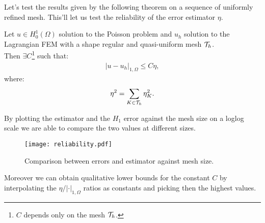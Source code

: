 Let's test the results given by the following theorem on a sequence of uniformly refined mesh. This'll let us test the reliability of the error estimator $\eta$.

\begin{theorem*}[Reliability]
	Let $u \in H_0^1(\Omega)$ solution to the Poisson problem and $u_h$ solution to the Lagrangian FEM with a shape regular and quasi-uniform mesh $\mathcal{T}_h$. \\
	Then $\exists C$\footnote{$C$ depends only on the mesh $\mathcal{T}_h$.} such that:
	\begin{gather}
		\lvert u - u_h \rvert_{1, \Omega} \leq C \eta,
	\end{gather}
	where:
	\begin{gather}
		\eta^2 = \sum_{K \in \mathcal{T}_h} \eta_K^2.
	\end{gather}
\end{theorem*}

By plotting the estimator and the $H_1$ error against the mesh size on a loglog scale we are able to compare the two values at different sizes.

\begin{figure}[!ht]
	\centering
	\texttt{[image: reliability.pdf]}
	\caption{Comparison between errors and estimator against mesh size.}
\end{figure}

\newpage
\noindent Moreover we can obtain qualitative lower bounds for the constant $C$ by interpolating the $\eta / \lvert \cdot \rvert_{1, \Omega}$ ratios as constants and picking then the highest values.


